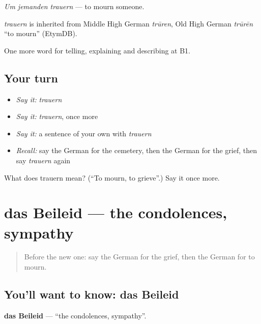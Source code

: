 \emph{Um jemanden trauern} — to mourn someone.

\begin{cousinweb}
\emph{trauern} is inherited from Middle High German \emph{trūren}, Old High German \emph{trūrēn} \textquotedblleft{}to mourn\textquotedblright{} (EtymDB).
\end{cousinweb}

\begin{grammarlens}[title={What you've built}]
One more word for telling, explaining and describing at B1.
\end{grammarlens}

\subsection*{Your turn}
\begin{itemize}
\raggedright
  \item \emph{Say it:} \emph{trauern}
  \item \emph{Say it:} \emph{trauern}, once more
  \item \emph{Say it:} a sentence of your own with \emph{trauern}
  \item \emph{Recall:} say the German for the cemetery, then the German for the grief, then say \emph{trauern} again
\end{itemize}

\begin{tcolorbox}[breakable,colback=teal!4,colframe=teal!35!black,title={Before you move on}]
What does trauern mean? (\textquotedblleft{}To mourn, to grieve\textquotedblright{}.) Say it once more.
\end{tcolorbox}
\section[das Beileid]{das Beileid — the condolences, sympathy}

\label{lesson:GE-C304-beileid}



\begin{quote}
Before the new one: say the German for the grief, then the German for to mourn.
\end{quote}

\subsection*{You'll want to know: das Beileid}
\textbf{das Beileid} — \textquotedblleft{}the condolences, sympathy\textquotedblright{}.

